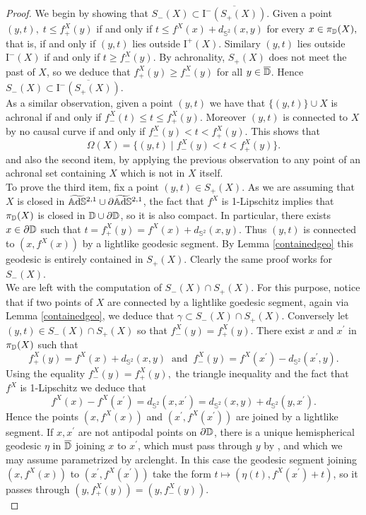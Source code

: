\begin{proof}
    We begin by showing that $S_-(X)\subset \overline{\text{I}^-(S_+(X))}$. Given a point $(y,t),\;t\leq f_+^X(y)$ if and only if $t\leq f^X(x)+d_{\mathbb{S}^2}(x,y)$ for every $x\in\pi_{\mathbb{D}}(X),$ that is, if and only if $(y,t)$ lies outside $\text{I}^+(X)$. Similary $(y,t)$ lies outside $\text{I}^-(X)$ if and only if $t\geq f_-^X(y).$ By achronality, $S_+(X)$ does not meet the past of $X$, so we deduce that $f_+^X(y)\geq f_-^X(y)$ for all $y\in\overline{\mathbb{D}}$. Hence $S_-(X)\subset \overline{\text{I}^-(S_+(X))}$.\\
    As a similar observation, given a point $(y,t)$ we have that $\{(y,t)\}\cup X$ is achronal if and only if $f_-^X(t)\leq t\leq f_+^X(y)$. Moreover $(y,t)$ is connected to $X$ by no causal curve if and only if $f_-^X(y)<t<f_+^X(y)$. This shows that 
    \[
        \Omega(X)=\{(y,t)\;|\;f_-^X(y)<t<f_+^X(y)\}.
    \]
    and also the second item, by applying the previous observation to any point of an achronal set containing $X$ which is not in $X$ itself. \\
    To prove the third item, fix a point $(y,t)\in S_+(X)$. As we are assuming that $X$ is closed in $\widetilde{\mathbb{A}\mathrm{d}\mathbb{S}}{}^{2,1}\cup\partial\widetilde{\mathbb{A}\mathrm{d}\mathbb{S}}{}^{2,1}$, the fact that $f^X$ is 1-Lipschitz implies that $\pi_{\mathbb{D}}(X)$ is closed in $\mathbb{D}\cup\partial\mathbb{D}$, so it is also compact. In particular, there exists $x\in\partial\mathbb{D}$ such that $t=f_+^X(y)=f^X(x)+d_{\mathbb{S}^2}(x,y)$. Thus $(y,t)$ is connected to $(x,f^X(x))$ by a lightlike geodesic segment. By Lemma \ref{containedgeo} this geodesic is entirely contained in $S_+(X)$. Clearly the same proof works for $S_-(X)$. \\
    We are left with the computation of $S_-(X)\cap S_+(X)$. For this purpose, notice that if two points of $X$ are connected by a lightlike goedesic segment, again via Lemma \ref{containedgeo}, we deduce that $\gamma\subset S_-(X)\cap S_+(X).$ Conversely let $(y,t)\in S_-(X)\cap S_+(X)$ so that $f_-^X(y)=f_+^X(y).$ There exist $x$ and $x^{\prime}$ in $\pi_{\mathbb{D}}(X)$ such that 
    \[
        f_+^X(y)=f^{X}(x)+d_{\mathbb{S}^2}(x,y) \;\;\text{and}\;\;f_-^X(y)=f^X(x^{\prime})-d_{\mathbb{S}^2}(x^{\prime},y). 
    \]
    Using the equality $f_-^X(y)=f_+^X(y),$ the triangle inequality and the fact that $f^X$ is 1-Lipschitz we deduce that 
    \begin{equation}\label{42}
        f^{X}(x)-f^X(x^{\prime})=d_{\mathbb{S}^2}(x,x^{\prime})=d_{\mathbb{S}^2}(x,y)+d_{\mathbb{S}^2}(y,x^{\prime}). 
       \end{equation}
       Hence the points $(x,f^X(x))$ and $(x^{\prime},f^X(x^{\prime} ))$ are joined by a lightlike segment. If $x,x^{\prime}$ are not antipodal points on $\partial\mathbb{D}$, there is a unique hemispherical geodesic $\eta$ in $\overline{\mathbb{D}}$ joining $x$ to $x^{\prime}$, which must pass through $y$ by , and which we may assume parametrized by arclenght. In this case the geodesic segment joining $(x,f^X(x))$ to $(x^{\prime},f^X(x^{\prime} ))$ take the form $t\mapsto(\eta(t),f^X(x^{\prime})+t)$, so it passes through $(y,f_+^X(y))=(y,f_-^X(y)).$\\

\end{proof}
